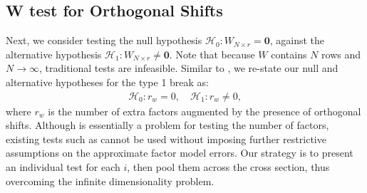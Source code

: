 \documentclass[12pt]{article}
\theoremstyle{plain}
\numberwithin{equation}{section}
\begin{document}
\subsection{W test for Orthogonal Shifts}
Next, we consider testing the null hypothesis $\mathcal{H}_0: W_{N \times r} = \mathbf{0}$, against the alternative hypothesis $\mathcal{H}_1: W_{N \times r} \neq \mathbf{0}$. Note that because $W$ contains $N$ rows and $N \to \infty$, traditional tests are infeasible. Similar to \textcite{han_tests_2015-1}, we re-state our null and alternative hypotheses for the type 1 break as:
\begin{align}
\label{eqn:W_null_alter_pool}
\mathcal{H}_0: r_w = 0, \quad \mathcal{H}_1: r_w \neq 0,
\end{align}
where $r_w$ is the number of extra factors augmented by the presence of orthogonal shifts. Although  is essentially a problem for testing the number of factors, existing tests such as \textcite{onatski_testing_2009} cannot be used without imposing further restrictive assumptions on the approximate factor model errors. Our strategy is to present an individual test for each $i$, then pool them across the cross section, thus overcoming the infinite dimensionality problem. 
\end{document}
